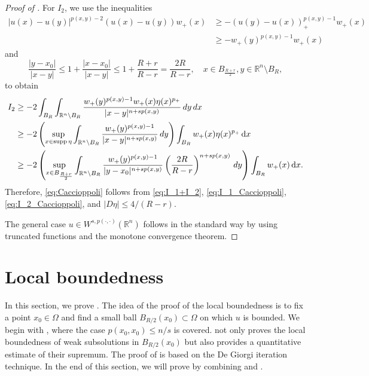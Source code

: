 \documentclass[11pt]{amsart}
\theoremstyle{plain}
\theoremstyle{definition}
\numberwithin{equation}{section}
\renewcommand{\d}{\textnormal{d}}
\newcommand{\R}{\mathbb{R}}
\begin{document}
\begin{proof} [Proof of ]
For $I_2$, we use the inequalities
\begin{equation*}
\begin{split}
|u(x)-u(y)|^{p(x,y)-2}(u(x)-u(y)) w_+(x)
&\geq -(u(y)-u(x))_+^{p(x,y)-1}w_+(x) \\
&\geq -w_+(y)^{p(x,y)-1} w_+(x)
\end{split}
\end{equation*}
and
\begin{equation*}
\frac{|y-x_0|}{|x-y|} \leq 1 + \frac{|x-x_0|}{|x-y|} \leq 1+\frac{R+r}{R-r} = \frac{2R}{R-r}, \quad x \in B_{\frac{R+r}{2}}, y \in \mathbb{R}^n \setminus B_R,
\end{equation*}
to obtain
\begin{equation} \label{eq:I_2_Caccioppoli}
\begin{split}
I_2
&\geq - 2 \int_{B_R} \int_{\mathbb{R}^n \setminus B_R} \frac{w_+(y)^{p(x,y)-1} w_+(x) \eta(x)^{p_+}}{|x-y|^{n+sp(x,y)}} \,\d y \,\d x \\
&\geq - 2\left( \sup_{x \in \mathrm{supp}\, \eta} \int_{\mathbb{R}^n \setminus B_R} \frac{w_+(y)^{p(x,y)-1}}{|x-y|^{n+sp(x,y)}} \,\d y \right) \int_{B_R} w_+(x) \eta(x)^{p_+} \,\mathrm{d}x \\
&\geq - 2 \left( \sup_{x \in B_{\frac{R+r}{2}}} \int_{\R^n \setminus B_R} \frac{w_+(y)^{p(x,y)-1}}{|y-x_0|^{n+sp(x,y)}} \left( \frac{2R}{R-r} \right)^{n+sp(x,y)} \, \d y \right) \int_{B_R} w_+(x) \,\mathrm{d}x.
\end{split}
\end{equation}
Therefore, \eqref{eq:Caccioppoli} follows from \eqref{eq:I_1+I_2}, \eqref{eq:I_1_Caccioppoli}, \eqref{eq:I_2_Caccioppoli}, and $|D\eta| \leq 4/(R-r)$.

The general case $u \in W^{s, p(\cdot,\cdot)}(\mathbb{R}^n)$ follows in the standard way by using truncated functions and the monotone convergence theorem.
\end{proof}










\section{Local boundedness} \label{sec:local_boundedness}

In this section, we prove . The idea of the proof of the local boundedness is to fix a point $x_0 \in \Omega$ and find a small ball $B_{R/2}(x_0) \subset \Omega$ on which $u$ is bounded. We begin with , where the case $p(x_0, x_0) \leq n/s$ is covered.  not only proves the local boundedness of weak subsolutions in $B_{R/2}(x_0)$ but also provides a quantitative estimate of their supremum. The proof of  is based on the De Giorgi iteration technique. In the end of this section, we will prove  by combining  and .
\end{document}
